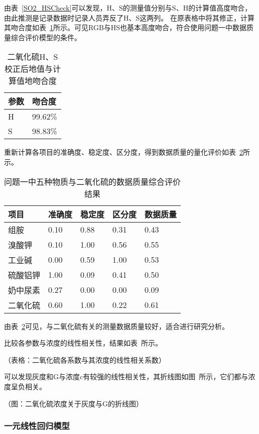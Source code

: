 由表~\ref{SO2_HSCheck}可以发现，H、S的测量值分别与S、H的计算值高度吻合，由此推测是记录数据时记录人员弄反了H、S这两列。
在原表格中将其修正，计算其吻合度如表~\ref{SO2_HSMatch}所示。可见RGB与HS也基本高度吻合，符合使用问题一中数据质量综合评价模型的条件。

\begin{table}[]
    \centering
    \caption{二氧化硫H、S校正后地值与计算值地吻合度}
    \label{SO2_HSMatch}
    \begin{tabular}{@{}ll@{}}
    \toprule
    参数 & 吻合度     \\ \midrule
    H  & 99.62\% \\
    S  & 98.83\% \\ \bottomrule
    \end{tabular}
    \end{table}

重新计算各项目的准确度、稳定度、区分度，得到数据质量的量化评价如表~\ref{SO2_Judge}所示。

\begin{table}[]
    \centering
    \caption{问题一中五种物质与二氧化硫的数据质量综合评价结果}
    \label{SO2_Judge}
    \begin{tabular}{@{}lllll@{}}
    \toprule
    项目   & 准确度  & 稳定度  & 区分度  & 数据质量 \\ \midrule
    组胺   & 0.10 & 0.88 & 0.31 & 0.43 \\
    溴酸钾  & 0.10 & 1.00 & 0.56 & 0.55 \\
    工业碱  & 0.00 & 0.59 & 1.00 & 0.53 \\
    硫酸铝钾 & 1.00 & 0.09 & 0.41 & 0.50 \\
    奶中尿素 & 0.27 & 0.00 & 0.00 & 0.09 \\
    二氧化硫 & 0.60 & 1.00 & 0.22 & 0.61 \\ \bottomrule
    \end{tabular}
    \end{table}

由表~\ref{SO2_Judge}可见，与二氧化硫有关的测量数据质量较好，适合进行研究分析。

比较各参数与浓度的线性相关性，结果如表~所示。

（表格：二氧化硫各系数与其浓度的线性相关系数）

可以发现灰度和G与浓度c有较强的线性相关性，其折线图如图~所示，它们都与浓度呈负相关。

（图：二氧化硫浓度关于灰度与G的折线图）

\subsubsection{一元线性回归模型}

